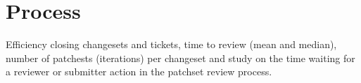 \section{Process}
Efficiency closing changesets and tickets, time to review (mean and median), number of patchests (iterations)
per changeset and study on the time waiting for a reviewer or submitter action in the patchset review process.
